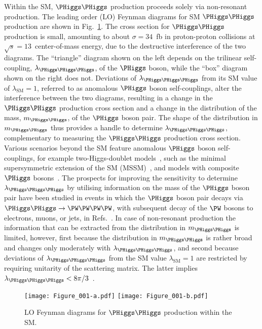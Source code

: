 Within the SM, $\PHiggs\PHiggs$ production proceeds solely via non-resonant production.
The leading order (LO) Feynman diagrams for SM $\PHiggs\PHiggs$ production are shown in Fig.~\ref{fig:FeynmanDiagrams_smHH}.
The cross section for $\PHiggs\PHiggs$ production is small, amounting to about $\sigma = 34$~fb in proton-proton collisions at $\sqrt{s}=13$~\TeV center-of-mass energy,
due to the destructive interference of the two diagrams.
The ``triangle'' diagram shown on the left depends on the trilinear self-coupling, $\lambda_{\PHiggs\PHiggs\PHiggs}$, of the $\PHiggs$ boson, 
while the ``box'' diagram shown on the right does not.
Deviations of $\lambda_{\PHiggs\PHiggs\PHiggs}$ from its SM value of $\lambda_{\textrm{SM}}=1$, referred to as anomalous $\PHiggs$ boson self-couplings,
alter the interference between the two diagrams, 
resulting in a change in the $\PHiggs\PHiggs$ production cross section and a change in the distribution of the mass, $m_{\PHiggs\PHiggs}$, of the $\PHiggs$ boson pair.
The shape of the distribution in $m_{\PHiggs\PHiggs}$ thus provides a handle to determine $\lambda_{\PHiggs\PHiggs\PHiggs}$,
complementary to measuring the $\PHiggs\PHiggs$ production cross section.
Various scenarios beyond the SM feature anomalous $\PHiggs$ boson self-couplings,
for example two-Higgs-doublet models~\cite{Branco:2011iw}, such as the minimal supersymmetric extension of the SM (MSSM)~\cite{Gunion:1989we},
and models with composite $\PHiggs$ bosons~\cite{Grober:2010yv,Contino:2012xk}.
The prospects for improving the sensitivity to determine $\lambda_{\PHiggs\PHiggs\PHiggs}$ by utilising information on the mass of the $\PHiggs$ boson pair
have been studied in events in which the $\PHiggs$ boson pair decays via $\PHiggs\PHiggs \to \PW\PW\PW\PW$, with subsequent decay of the $\PW$ bosons to electrons, muons, or jets,
in Refs.~\cite{Baur:2002rb,Baur:2002qd}.
In case of non-resonant production the information that can be extracted from the distribution in $m_{\PHiggs\PHiggs}$ is limited, however,
first because the distribution in $m_{\PHiggs\PHiggs}$ is rather broad and changes only moderately with $\lambda_{\PHiggs\PHiggs\PHiggs}$,
and second because deviations of $\lambda_{\PHiggs\PHiggs\PHiggs}$ from the SM value $\lambda_{\textrm{SM}}=1$ are restricted by requiring unitarity of the scattering matrix.
The latter implies $\lambda_{\PHiggs\PHiggs\PHiggs} < 8\pi/3$~\cite{Lee:1977yc}.

\begin{figure}
\centering
\texttt{[image: Figure\_001-a.pdf]} \hspace{\fill}
\texttt{[image: Figure\_001-b.pdf]} \hspace{\fill}
\caption{ LO Feynman diagrams for $\PHiggs\PHiggs$ production within the SM.}
\label{fig:FeynmanDiagrams_smHH}
\end{figure}

